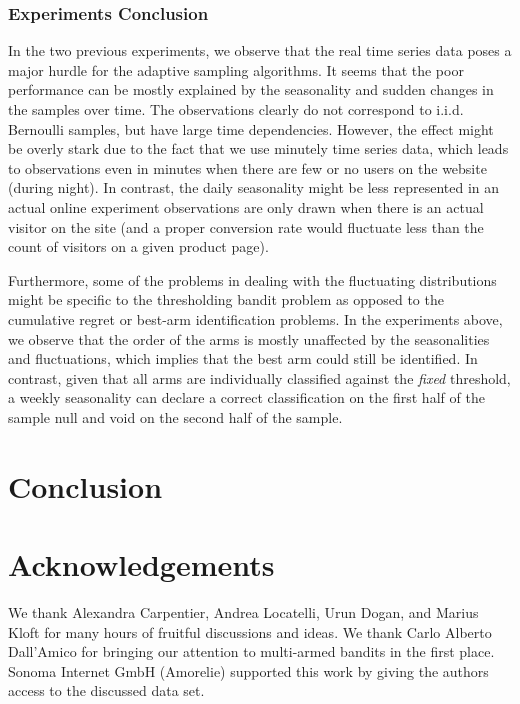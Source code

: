 \documentclass[11pt,]{article}
\begin{document}
\subsubsection{Experiments Conclusion}\label{experiments-conclusion}

In the two previous experiments, we observe that the real time series
data poses a major hurdle for the adaptive sampling algorithms. It seems
that the poor performance can be mostly explained by the seasonality and
sudden changes in the samples over time. The observations clearly do not
correspond to i.i.d. Bernoulli samples, but have large time
dependencies. However, the effect might be overly stark due to the fact
that we use minutely time series data, which leads to observations even
in minutes when there are few or no users on the website (during night).
In contrast, the daily seasonality might be less represented in an
actual online experiment observations are only drawn when there is an
actual visitor on the site (and a proper conversion rate would fluctuate
less than the count of visitors on a given product page).

Furthermore, some of the problems in dealing with the fluctuating
distributions might be specific to the thresholding bandit problem as
opposed to the cumulative regret or best-arm identification problems. In
the experiments above, we observe that the order of the arms is mostly
unaffected by the seasonalities and fluctuations, which implies that the
best arm could still be identified. In contrast, given that all arms are
individually classified against the \emph{fixed} threshold, a weekly
seasonality can declare a correct classification on the first half of
the sample null and void on the second half of the sample.

\section{Conclusion}\label{conclusion-1}

\section{Acknowledgements}\label{acknowledgements}

We thank Alexandra Carpentier, Andrea Locatelli, Urun Dogan, and Marius
Kloft for many hours of fruitful discussions and ideas. We thank Carlo
Alberto Dall'Amico for bringing our attention to multi-armed bandits in
the first place. Sonoma Internet GmbH (Amorelie) supported this work by
giving the authors access to the discussed data set.
\end{document}
